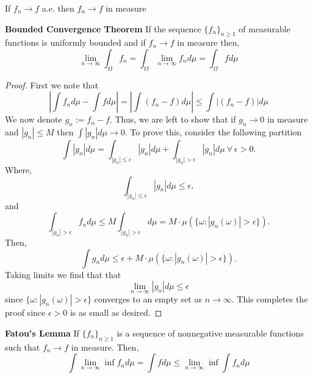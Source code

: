 \documentclass[../TGMAFFIRO.tex]{subfiles}
\begin{document}

\begin{proposition} \label{prop:convergence_ae_measure}
	If $f_n \to f$ a.e. then $f_n \to f$ in measure
\end{proposition}

\begin{theorem} \textbf{Bounded Convergence Theorem}
	If the sequence $\{f_n\}_{n\geq 1}$ of measurable functions is uniformly bounded and if $f_n \to f$ in measure then,
	\begin{equation}
		\lim_{n\to\infty} \int_\Omega f_n = 	\int_\Omega \lim_{n\to\infty} f_n d\mu = \int_\Omega f d\mu
	\end{equation}
\end{theorem}

\begin{proof}
	First we note that
	\[
		|\int f_n d\mu - \int f d\mu| = |\int (f_n - f) d\mu| \leq \int| (f_n - f) | d\mu
	\]
	We now denote $g_n := f_n - f$. Thus, we are left to show that if $g_n \to 0$ in measure and $|g_n| \leq M$ then $\int |g_n| d\mu \to 0$. To prove this, consider the following partition
	\[
		\int|g_n| d\mu = \int_{|g_n| \leq \epsilon}|g_n| d\mu + \int_{|g_n| > \epsilon}|g_n| d\mu \ \forall \ \epsilon > 0.
	\]
	Where,
	\[
		\int_{|g_n| \leq \epsilon} |g_n| d\mu \leq \epsilon,
	\]
	and
	\[
		\int_{|g_n| > \epsilon} f_n d\mu \leq M\int_{|g_n| > \epsilon} d\mu = M\cdot\mu(\{\omega : |g_n(\omega)| > \epsilon\}).
	\]
	Then,
	\begin{equation}
		\int g_n d\mu \leq \epsilon + M\cdot\mu(\{\omega : |g_n(\omega)| > \epsilon\}).
	\end{equation}
	Taking limits we find that that
	\[
		\lim_{n\to\infty} |g_n| d\mu \leq \epsilon
	\]
	since $\{\omega : |g_n(\omega)| > \epsilon\}$ converges to an empty set as $n\to\infty$. This completes the proof since $\epsilon > 0$ is as small as desired.
\end{proof}

\begin{theorem} \textbf{Fatou's Lemma}
If $\{f_n\}_{n\geq 1}$ is a sequence of nonnegative measurable functions such that $f_n \to f$ in measure. Then,
\begin{equation}
	\int\lim_{n\to\infty}\inf f_n d\mu = \int f d\mu \leq \lim_{n\to\infty}\inf\int f_n d\mu
\end{equation}
\end{theorem}
\end{document}
